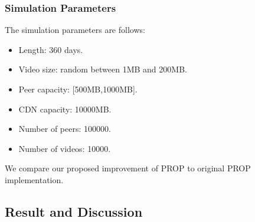 \documentclass[conference]{IEEEtran}
\begin{document}
\subsubsection{Simulation Parameters}
The simulation parameters are follows:
\begin{itemize}
\item Length: 360 days.
\item Video size: random between 1MB and 200MB.
\item Peer capacity: [500MB,1000MB].
\item CDN capacity: 10000MB.
\item Number of peers: 100000.
\item Number of videos: 10000.
\end{itemize}
We compare our proposed improvement of PROP to original PROP \cite{1613869} implementation.



\subsection{Result and Discussion}\label{resultanddiscussion}
\end{document}
